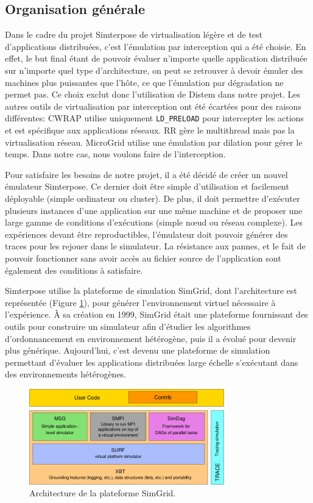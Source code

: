 \subsection{Organisation générale}

Dans le cadre du projet Simterpose de virtualisation légère et de test
d'applications distribuées, c'est l'émulation par interception qui a été
choisie. En effet, le but final étant de pouvoir évaluer n'importe quelle
application distribuée sur n'importe quel type d'architecture, on peut se
retrouver à devoir émuler des machines plus puissantes que l'hôte, ce que
l'émulation par dégradation ne permet pas. Ce choix exclut donc l'utilisation de
Distem dans notre projet. Les autres outils de virtualisation par interception
ont été écartées pour des raisons différentes: CWRAP utilise uniquement
\texttt{LD\_PRELOAD} pour intercepter les actions et est spécifique aux
applications réseaux. RR gère le multithread mais pas la virtualisation réseau. MicroGrid utilise une émulation par dilation pour gérer le temps. Dans notre cas, nous voulons faire de l'interception.

Pour satisfaire les besoins de notre projet, il a été décidé de créer un nouvel
émulateur Simterpose. Ce dernier doit être simple d'utilisation et facilement
déployable (simple ordinateur ou cluster).  De plus, il doit permettre
d'exécuter plusieurs instances d'une application sur une même machine et de proposer une large gamme de conditions d'exécutions (simple n\oe ud ou réseau
complexe). Les expériences devant être reproductibles, l'émulateur doit pouvoir
générer des traces pour les rejouer dans le simulateur. La résistance aux
pannes, et le fait de pouvoir fonctionner sans avoir accès au fichier source de
l'application sont également des conditions à satisfaire.

Simterpose utilise la plateforme de simulation SimGrid, dont l'architecture
est représentée (Figure \ref{SimGrid}), pour générer l'environnement virtuel
nécessaire à l'expérience. À sa création en 1999, SimGrid
\citep{CASANOVA:SimGrid} était une plateforme fournissant des outils pour
construire un simulateur afin d'étudier les algorithmes d'ordonnancement en
environnement hétérogène, puis il a évolué \citep{MARTIN:SimGrid} pour devenir
plus générique. Aujourd'hui, c'est devenu une plateforme de simulation
permettant d'évaluer les applications distribuées large échelle s'exécutant dans
des environnements hétérogènes.
 
\begin{figure}[H]
  \centering
  \includegraphics[scale=0.86]{Pictures/png/SimGrid}
  \caption{Architecture de la plateforme SimGrid.}
  \label{SimGrid}
\end{figure}

